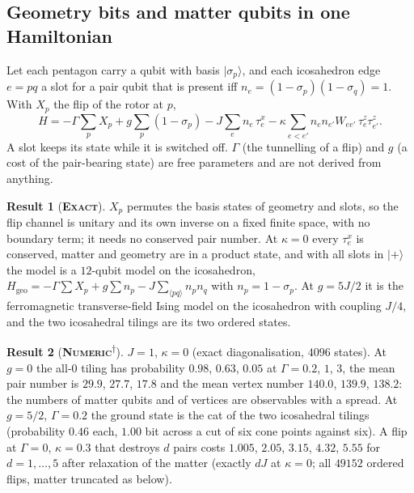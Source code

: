 \documentclass[11pt]{article}
\newcommand{\exact}{\textbf{\textsc{Exact}}}
\newcommand{\numeric}{\textbf{\textsc{Numeric}}}
\newcommand{\snap}{\textsuperscript{$\dagger$}}      %
\theoremstyle{definition}
\newtheorem{result}{Result}
\begin{document}
\subsection{Geometry bits and matter qubits in one Hamiltonian}
Let each pentagon carry a qubit with basis $|\sigma_p\rangle$, and each icosahedron edge $e=pq$ a slot for a pair qubit that is present iff $n_e=(1-\sigma_p)(1-\sigma_q)=1$. With $X_p$ the flip of the rotor at $p$,
\begin{equation}\label{eq:hjoint}
H=-\Gamma\sum_pX_p+g\sum_p(1-\sigma_p)-J\sum_en_e\,\tau^x_e-\kappa\sum_{e<e'}n_en_{e'}W_{ee'}\,\tau^z_e\tau^z_{e'} .
\end{equation}
A slot keeps its state while it is switched off. $\Gamma$ (the tunnelling of a flip) and $g$ (a cost of the pair-bearing state) are free parameters and are not derived from anything.
\begin{result}[\exact]\label{res:sphere-channel}
$X_p$ permutes the basis states of geometry and slots, so the flip channel is unitary and its own inverse on a fixed finite space, with no boundary term; it needs no conserved pair number. At $\kappa=0$ every $\tau^x_e$ is conserved, matter and geometry are in a product state, and with all slots in $|+\rangle$ the model is a $12$-qubit model on the icosahedron, $H_{\mathrm{geo}}=-\Gamma\sum X_p+g\sum n_p-J\sum_{\langle pq\rangle}n_pn_q$ with $n_p=1-\sigma_p$. At $g=5J/2$ it is the ferromagnetic transverse-field Ising model on the icosahedron with coupling $J/4$, and the two icosahedral tilings are its two ordered states.
\end{result}
\begin{result}[\numeric\snap]\label{res:sphere-ground}
$J=1$, $\kappa=0$ (exact diagonalisation, $4096$ states). At $g=0$ the all-$0$ tiling has probability $0.98$, $0.63$, $0.05$ at $\Gamma=0.2$, $1$, $3$, the mean pair number is $29.9$, $27.7$, $17.8$ and the mean vertex number $140.0$, $139.9$, $138.2$: the numbers of matter qubits and of vertices are observables with a spread. At $g=5/2$, $\Gamma=0.2$ the ground state is the cat of the two icosahedral tilings (probability $0.46$ each, $1.00$ bit across a cut of six cone points against six). A flip at $\Gamma=0$, $\kappa=0.3$ that destroys $d$ pairs costs $1.005$, $2.05$, $3.15$, $4.32$, $5.55$ for $d=1,\dots,5$ after relaxation of the matter (exactly $dJ$ at $\kappa=0$; all $49152$ ordered flips, matter truncated as below).
\end{result}
\end{document}
